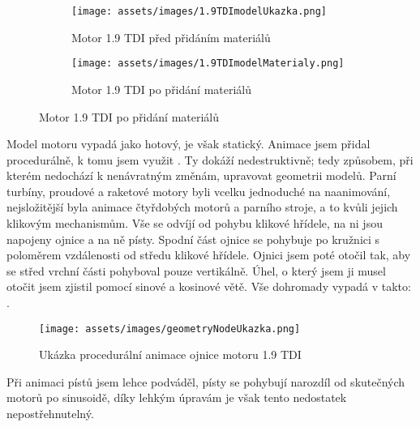 \begin{figure}[H]
    \centering
    \begingroup
    \makeatletter
    \renewcommand\thesubfigure{\thefigure~--~\@nameuse{subfiglabel@\alph{subfigure}}}
    \newcommand{\subfiglabel@a}{vlevo}
    \newcommand{\subfiglabel@b}{vpravo}
    \captionsetup[subfigure]{labelformat=simple, labelsep=colon}
    \renewcommand\p@subfigure{}
    \makeatother
    \begin{subfigure}[t]{.45\textwidth}
        \centering
        \texttt{[image: assets/images/1.9TDImodelUkazka.png]}
        \caption{Motor 1.9 TDI před přidáním materiálů \jaObr}
        \label{obr:predMaterialy}
    \end{subfigure}
    \hfill
    \begin{subfigure}[t]{.45\textwidth}
        \centering
        \texttt{[image: assets/images/1.9TDImodelMaterialy.png]}
        \caption{Motor 1.9 TDI po přidání materiálů \jaObr}
        \label{obr:poMaterialy}
    \end{subfigure}
    \endgroup
\end{figure}

{Model motoru vypadá jako hotový, je však statický. Animace jsem přidal procedurálně, k tomu jsem využit . Ty dokáží nedestruktivně; tedy způsobem, při kterém nedochází k nenávratným změnám, upravovat geometrii modelů. Parní turbíny, proudové a raketové motory byli vcelku jednoduché na naanimování, nejsložitější byla animace čtyřdobých motorů a parního stroje, a to kvůli jejich klikovým mechanismům.}\odst
{Vše se odvíjí od pohybu klikové hřídele, na ni jsou napojeny ojnice a na ně písty. Spodní část ojnice se pohybuje po kružnici s poloměrem vzdálenosti od středu klikové hřídele. Ojnici jsem poté otočil tak, aby se střed vrchní části pohyboval pouze vertikálně. Úhel, o který jsem ji musel otočit jsem zjistil pomocí sinové a kosinové větě. Vše dohromady vypadá v  takto: .}

\begin{figure}[H]
    \centering
    \texttt{[image: assets/images/geometryNodeUkazka.png]}
    \caption{Ukázka procedurální animace ojnice motoru 1.9 TDI \jaObr}
    \label{obr:geometryNodeUkazka}
\end{figure}

{Při animaci pístů jsem lehce podváděl, písty se pohybují narozdíl od skutečných motorů po sinusoidě, díky lehkým úpravám je však tento nedostatek nepostřehnutelný.}

